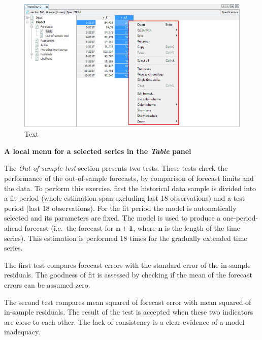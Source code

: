 \documentclass[
  letterpaper,
  DIV=11,
  numbers=noendperiod]{scrreprt}
\begin{document}
\begin{figure}

{\centering \includegraphics{./All_images/image44_RMSB.png}

}

\caption{Text}

\end{figure}

\textbf{A local menu for a selected series in the \emph{Table} panel}

The \emph{Out-of-sample test} section presents two tests. These tests
check the performance of the out-of-sample forecasts, by comparison of
forecast limits and the data. To perform this exercise, first the
historical data sample is divided into a fit period (whole estimation
span excluding last 18 observations) and a test period (last 18
observations). For the fit period the model is automatically selected
and its parameters are fixed. The model is used to produce a
one-period-ahead forecast (i.e.~the forecast for \(\mathbf{n + 1}\),
where \(\mathbf{n}\) is the length of the time series). This estimation
is performed 18 times for the gradually extended time series.

The first test compares forecast errors with the standard error of the
in-sample residuals. The goodness of fit is assessed by checking if the
mean of the forecast errors can be assumed zero.

The second test compares mean squared of forecast error with mean
squared of in-sample residuals. The result of the test is accepted when
these two indicators are close to each other. The lack of consistency is
a clear evidence of a model inadequacy.
\end{document}
